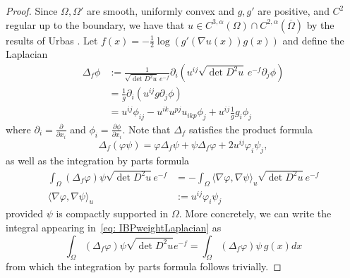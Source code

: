\documentclass[12pt,reqno]{amsart}
\newcommand{\del}{\partial}
\numberwithin{equation}{section}
\begin{document}
\begin{proof}
Since $\Omega, \Omega'$ are smooth, uniformly convex and $g,g'$ are positive, and $C^2$ regular up to the boundary, we have that $u\in C^{3,\alpha}(\Omega) \cap C^{2,\alpha}(\overline{\Omega})$ by the results of Urbas \cite{Urbas}. Let $f(x)=-\frac{1}{2}\log (g'(\nabla u(x))g(x))$ and define the Laplacian
\[
\begin{aligned}
\Delta_f \phi &:= \frac{1}{\sqrt{\det D^2u}\,e^{-f}}\del_i(u^{ij}\sqrt{\det D^2u}\, e^{-f}\del_j\phi)\\
&= \frac{1}{g}\del_i(u^{ij} g \del_j\phi)\\
&=u^{ij}\phi_{ij}-u^{ik}u^{pj}u_{ikp}\phi_j+u^{ij}\frac{1}{g}g_i\phi_j
\end{aligned}
\]
where $\del_i = \frac{\del}{\del x_i}$ and $\phi_i = \frac{\del \phi}{\del x_i}$.  Note that $\Delta_f$ satisfies the product formula
\[
\Delta_f(\varphi \psi) = \varphi \Delta_f\psi + \psi \Delta_f \varphi + 2u^{ij}\varphi_i\psi_j,
\]
as well as the integration by parts formula
\begin{equation}\label{eq: IBPweightLaplacian}
\begin{aligned}
\int_{\Omega} (\Delta_f\varphi) \psi \sqrt{\det D^2u}e^{-f} &= -\int_{\Omega} \langle \nabla \varphi, \nabla \psi\rangle_u\sqrt{\det D^2u}e^{-f}\\
\langle \nabla \varphi, \nabla \psi \rangle_u &:= u^{ij}\varphi_i\psi_j
\end{aligned}
\end{equation}
provided $\psi$ is compactly supported in $\Omega$.  More concretely, we can write the integral appearing in~\eqref{eq: IBPweightLaplacian} as
\[
\int_{\Omega} (\Delta_f\varphi) \psi \sqrt{\det D^2u}e^{-f}=\int_{\Omega} (\Delta_f\varphi) \psi\, g(x)dx
\]
from which the integration by parts formula follows trivially.


\end{proof}
\end{document}

